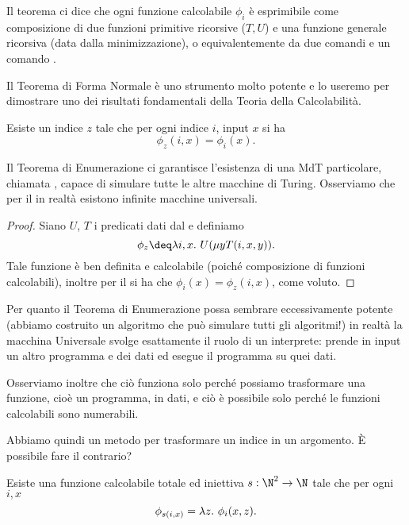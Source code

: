 \begin{remark}
    Il teorema ci dice che ogni funzione calcolabile $\phi_i$ è esprimibile come composizione di due funzioni primitive ricorsive ($T, U$) e una funzione generale ricorsiva (data dalla minimizzazione), o equivalentemente da due comandi \FOR{} e un comando \WHILE. 
\end{remark}

Il Teorema di Forma Normale è uno strumento molto potente e lo useremo per dimostrare uno dei risultati fondamentali della Teoria della Calcolabilità.

\begin{theorem}
    Esiste un indice $z$ tale che per ogni indice $i$, input $x$ si ha \[
        \phi_z(i, x) = \phi_i(x).
    \]  
\end{theorem}

Il Teorema di Enumerazione ci garantisce l'esistenza di una MdT particolare, chiamata , capace di simulare tutte le altre macchine di Turing. Osserviamo che per il  in realtà esistono infinite macchine universali.

\begin{proof}   
    Siano $U$, $T$ i predicati dati dal  e definiamo \[
        \phi_z \deq \lam{i, x}{U(\mu{y}{T(i, x, y)})}.
    \] Tale funzione è ben definita e calcolabile (poiché composizione di funzioni calcolabili), inoltre per il  si ha che $\phi_i(x) = \phi_z(i, x)$, come voluto. 
\end{proof}

Per quanto il Teorema di Enumerazione possa sembrare eccessivamente potente (abbiamo costruito un algoritmo che può simulare tutti gli algoritmi!) in realtà la macchina Universale svolge esattamente il ruolo di un interprete: prende in input un altro programma e dei dati ed esegue il programma su quei dati.

Osserviamo inoltre che ciò funziona solo perché possiamo trasformare una funzione, cioè un programma, in dati, e ciò è possibile solo perché le funzioni calcolabili sono numerabili.

Abbiamo quindi un metodo per trasformare un indice in un argomento. È possibile fare il contrario?

\begin{theorem}
    Esiste una funzione calcolabile totale ed iniettiva $s : \N^2 \to \N$ tale che per ogni $i, x$ \[
        \phi_{s(i, x)} = \lambda{z}.\ {\phi_i(x, z)}.
    \] 
\end{theorem}

